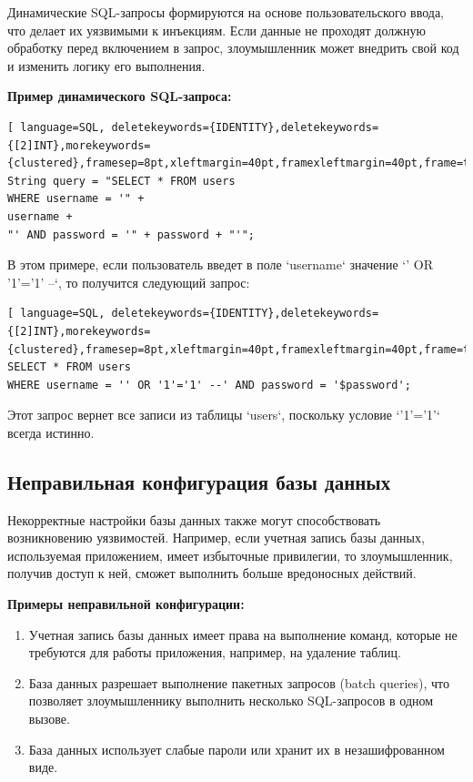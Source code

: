 \documentclass[a4paper,12pt]{diplom}
\begin{document}
	Динамические SQL-запросы формируются на основе пользовательского ввода, что делает их уязвимыми к инъекциям.  Если данные не проходят должную обработку перед включением в запрос, злоумышленник может внедрить свой код и изменить логику его выполнения. 
	
	\textbf{Пример динамического SQL-запроса:}
	
	\begin{lstlisting}[ language=SQL, deletekeywords={IDENTITY},deletekeywords={[2]INT},morekeywords={clustered},framesep=8pt,xleftmargin=40pt,framexleftmargin=40pt,frame=tb,framerule=0pt]    
String query = "SELECT * FROM users
WHERE username = '" +
username + 
"' AND password = '" + password + "'";
	\end{lstlisting}
	
	В этом примере, если пользователь введет в поле `username` значение `' OR '1'='1' --`,  то получится следующий запрос: 
	
	\begin{lstlisting}[ language=SQL, deletekeywords={IDENTITY},deletekeywords={[2]INT},morekeywords={clustered},framesep=8pt,xleftmargin=40pt,framexleftmargin=40pt,frame=tb,framerule=0pt]    
SELECT * FROM users 
WHERE username = '' OR '1'='1' --' AND password = '$password';
	\end{lstlisting}
	
	Этот запрос вернет все записи из таблицы `users`,  поскольку условие `'1'='1'`  всегда истинно. 
	
	\subsection{Неправильная конфигурация базы данных}
	
	Некорректные настройки базы данных также могут способствовать возникновению уязвимостей.  Например,  если учетная запись базы данных, используемая приложением, имеет избыточные привилегии,  то злоумышленник,  получив доступ к ней,  сможет выполнить больше вредоносных действий. 
	
	\textbf{Примеры неправильной конфигурации:}
	
	\begin{enumerate}[label=\arabic{enumi})]
		\item Учетная запись базы данных имеет права на выполнение команд, которые не требуются для работы приложения, например, на удаление таблиц.
		\item База данных разрешает выполнение пакетных запросов (batch queries),  что позволяет злоумышленнику выполнить несколько SQL-запросов в одном вызове. 
		\item База данных использует слабые пароли или хранит их в незашифрованном виде.
	\end{enumerate}
	
\end{document}
